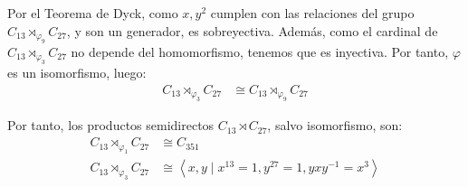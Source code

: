 \documentclass[12pt]{article}
\begin{document}
\begin{ejercicio}
\begin{enumerate}
            Por el Teorema de Dyck, como $x,y^2$ cumplen con las relaciones del grupo $C_{13} \rtimes_{\varphi_9} C_{27}$, y son un generador, es sobreyectiva. Además, como el cardinal de $C_{13} \rtimes_{\varphi_3} C_{27}$ no depende del homomorfismo, tenemos que es inyectiva. Por tanto, $\varphi$ es un isomorfismo, luego:
            \begin{align*}
                C_{13} \rtimes_{\varphi_3} C_{27} & \cong C_{13} \rtimes_{\varphi_9} C_{27}
            \end{align*}

            Por tanto, los productos semidirectos $C_{13} \rtimes C_{27}$, salvo isomorfismo, son:
            \begin{align*}
                C_{13} \rtimes_{\varphi_1} C_{27} & \cong C_{351} \\
                C_{13} \rtimes_{\varphi_3} C_{27} & \cong \left\langle x,y\mid x^{13}=1, y^{27}=1, yxy^{-1}=x^3\right\rangle
            \end{align*}
        \end{enumerate}
    \end{ejercicio}
\end{document}
